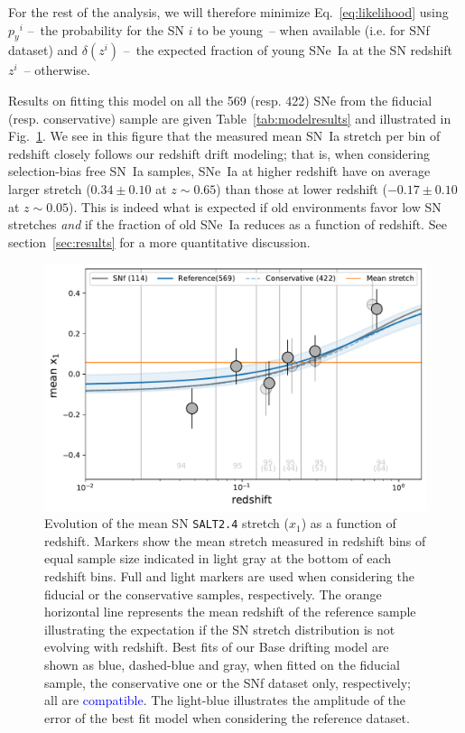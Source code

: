 \documentclass[]{aa} %
\newcommand{\mr}[1]{{\textcolor[rgb]{0.60,0.10,0.6}{#1}}}
\newcommand{\nn}[1]{{\textcolor[rgb]{1, 0.27, 0}{#1}}}
\newcommand{\yc}[1]{{\textcolor{blue}{#1}}}
\begin{document}
\mr{For the rest of the analysis, we will therefore minimize
Eq.~\ref{eq:likelihood} using \nn{$p_y{}^i$} --~the
probability for the SN $i$ to be young~-- when available (i.e. for SNf
dataset) and $\delta(z^{i})$ --~the expected fraction of young SNe~Ia at the
SN redshift $z^{i}$~-- otherwise.}

\mr{Results on fitting this model on all the 569 (resp. 422) SNe from the 
fiducial (resp. conservative) sample
are given Table~\ref{tab:modelresults} and illustrated in
Fig.~\ref{fig:modelall}. We see in this figure that the measured mean SN~Ia
stretch per bin of redshift closely follows our redshift drift modeling; that is, when
considering selection-bias free SN~Ia samples, SNe~Ia at higher redshift have on
average larger stretch ($0.34 \pm 0.10$ at $z\sim0.65$) than those at lower
redshift ($-0.17\pm 0.10$ at $z\sim0.05$). This is indeed what is expected if
old environments favor low SN stretches \citep[e.g.][]{howell2007} \emph{and} if
the fraction of old SNe~Ia reduces as a function of redshift. See
section~\ref{sec:results} for a more quantitative discussion.}

\begin{figure}
    \centering
    \includegraphics[width=0.7\linewidth]{Article_figures/stretchevol_all_vs_snf.pdf}
    \caption{Evolution of the mean SN \textsc{\texttt{SALT2.4}} stretch ($x_1$)
    as a function of redshift. Markers show the mean stretch measured in
    redshift bins of equal sample size indicated in light gray at the bottom
    of each redshift bins. Full and light markers are used when considering
    the fiducial or the conservative samples, respectively. The orange horizontal line represents the mean
    redshift of the reference sample illustrating the expectation if the SN
    stretch distribution is not evolving with redshift. Best fits of our Base drifting
    model are shown as blue, dashed-blue and gray, when fitted on the
    fiducial sample, the conservative one or the SNf dataset only, respectively; all are \yc{compatible}.
The light-blue illustrates the amplitude of the error of the best fit model when
considering the reference dataset.}
    \label{fig:modelall}
\end{figure}
\end{document}
